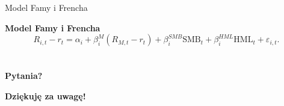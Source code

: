 \documentclass[a4paper, 11pt]{beamer}
\begin{document}
	\begin{frame}{Model Famy i Frencha}
		\begin{block}{\textbf{Model Famy i Frencha}} \[
R_{i,t}-r_{t}=\alpha_{i}+\beta_{i}^{M}\left(R_{M,t}-r_{t}\right)+\beta_{i}^{SMB}\mbox{SMB}_{t}+\beta_{i}^{HML}\mbox{HML}_{t}+\varepsilon_{i,t}.
			\]
		\end{block}
	\end{frame}
	
	\section*{}

	\begin{frame}
		\center
		\Huge \bfseries
		Pytania?
	\end{frame}

	\begin{frame}
		\center
		\Huge \bfseries
		Dziękuję za uwagę!
	\end{frame}
\end{document}
